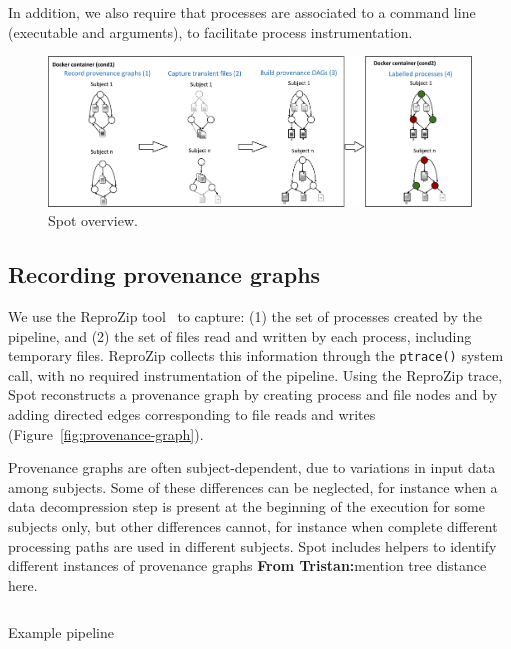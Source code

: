 \documentclass[a4paper,num-refs]{oup-contemporary}
\newcommand{\reprozip}[0]{ReproZip\xspace}
\newcommand{\tristan}[1]{\color{blue}\textbf{From Tristan:}#1\color{black}}
\newcommand{\toolname}[0]{Spot\xspace}
\begin{document}
In addition, we also require that processes are
associated to a command line (executable and arguments), to facilitate
process instrumentation.

\begin{figure}
  \centering
    \includegraphics[width=.8\textwidth]{images/spot-diagram}
    \caption{\toolname overview.}
    \label{fig:overview-tool}
  \end{figure}

\subsection{Recording provenance graphs}

We use the \reprozip tool~\cite{rampin2016reprozip}
to capture: (1) the set of processes created by the
pipeline, and
(2) the set of files read and written by each process, including
temporary files. \reprozip collects this information through the
\texttt{ptrace()} system call, with no required instrumentation of the pipeline.
Using the \reprozip trace, \toolname reconstructs a provenance graph by creating process and file
nodes and by adding directed edges corresponding
to file reads and writes (Figure~\ref{fig:provenance-graph}).

Provenance graphs are often subject-dependent, due to variations in input data among subjects.
Some of these differences can be neglected, for instance when a
data decompression step is present at the beginning of the execution for
some subjects only, but other differences cannot, for instance
when complete different processing paths are used in different subjects. \toolname 
includes helpers to identify different instances of provenance graphs \tristan{mention tree distance here}.

\begin{listing}
  \inputminted{bash}{"bin/example.sh"}
  \caption{Example pipeline}
  \label{listing:sample-script}
\end{listing}
\end{document}
